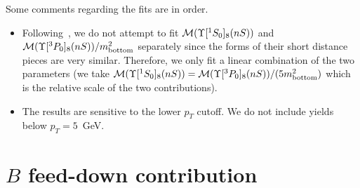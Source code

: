 \documentclass[article,showpacs,preprintnumbers,amsmath,amssymb]{revtex4}
\newcommand{\bottom}{{\rm{bottom}}}
\begin{document}
\begin{appendix}
Some comments regarding the fits are in order.
\begin{itemize}
\item{Following~\cite{Cho:1995ce,Cho:1995vh}, we do not attempt to fit
${\cal{M}}(\Upsilon[^1S_0]_{8}(nS))$ and
${\cal{M}}(\Upsilon[^3P_0]_{8}(nS))/m_{\bottom}^2$
separately since the forms of their short distance pieces are very similar.
Therefore, we only fit a linear combination of the two parameters (we take
${\cal{M}}(\Upsilon[^1S_0]_{8}(nS))={\cal{M}}(\Upsilon[^3P_0]_{8}(nS))/(5m_{\bottom}^2)$ which
is the relative scale of the two contributions).}
\item{The results are sensitive to the lower $p_T$ cutoff. We do not include
yields below $p_T=5$~GeV.}
\end{itemize}

\section{$B$ feed-down contribution~\label{appendix:Bfeed}}


\end{appendix}
\end{document}
